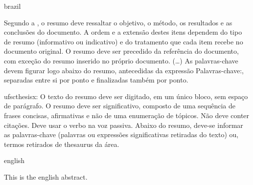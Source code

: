 %
\begin{otherlanguage*}{brazil}
\begin{resumo}[Resumo]

    Segundo a , o resumo deve ressaltar o
    objetivo, o método, os resultados e as conclusões do documento. A ordem e a extensão
    destes itens dependem do tipo de resumo (informativo ou indicativo) e do
    tratamento que cada item recebe no documento original. O resumo deve ser
    precedido da referência do documento, com exceção do resumo inserido no
    próprio documento. (\ldots) As palavras-chave devem figurar logo abaixo do
    resumo, antecedidas da expressão Palavras-chave:, separadas entre si por
    ponto e finalizadas também por ponto.

    ufscthesisx:
    O texto do resumo deve ser digitado, em um único bloco, sem espaço de parágrafo. O resumo deve
    ser significativo, composto de uma sequência de frases concisas, afirmativas e não de uma
    enumeração de tópicos. Não deve conter citações. Deve usar o verbo na voz passiva. Abaixo do
    resumo, deve-se informar as palavras-chave (palavras ou expressões significativas retiradas do
    texto) ou, termos retirados de thesaurus da área. \showfont


\end{resumo}
\end{otherlanguage*}


\begin{otherlanguage*}{english}
\begin{resumo}[Abstract]

    This is the english abstract.


\end{resumo}
\end{otherlanguage*}





